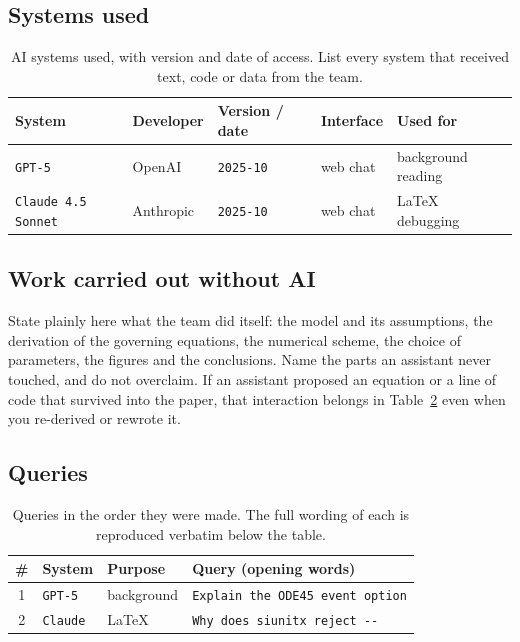\subsection{Systems used}
\label{sec:ai-systems}

\begin{table}[H]
  \centering
  \small
  \setlength{\tabcolsep}{4pt}
  \caption{AI systems used, with version and date of access. List every
  system that received text, code or data from the team.}
  \label{tab:ai-systems}
  \begin{tabular}{@{}l l l l p{}@{}}
    \toprule
    System & Developer & Version / date & Interface & Used for \\
    \midrule
    \verb|GPT-5|             & OpenAI    & \verb|2025-10| & web chat & background reading \\
    \verb|Claude 4.5 Sonnet| & Anthropic & \verb|2025-10| & web chat & LaTeX debugging    \\
    \bottomrule
  \end{tabular}
\end{table}

\subsection{Work carried out without AI}
\label{sec:ai-noai}

State plainly here what the team did itself: the model and its assumptions,
the derivation of the governing equations, the numerical scheme, the choice
of parameters, the figures and the conclusions. Name the parts an assistant
never touched, and do not overclaim. If an assistant proposed an equation or
a line of code that survived into the paper, that interaction belongs in
Table~\ref{tab:ai-queries} even when you re-derived or rewrote it.

\subsection{Queries}
\label{sec:ai-queries}

\begin{table}[H]
  \centering
  \small
  \caption{Queries in the order they were made. The full wording of each is
  reproduced verbatim below the table.}
  \label{tab:ai-queries}
  \begin{tabular}{@{}c l l p{}@{}}
    \toprule
    \# & System & Purpose & Query (opening words) \\
    \midrule
    1 & \verb|GPT-5|  & background & \verb|Explain the ODE45 event option| \\
    2 & \verb|Claude| & LaTeX      & \verb|Why does siunitx reject --|     \\
    \bottomrule
  \end{tabular}
\end{table}

